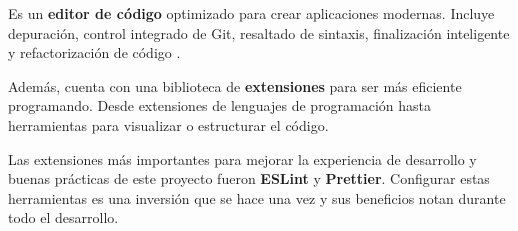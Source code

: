 \documentclass[12pt,twoside,titlepage]{report}
\begin{document}
Es un \textbf{editor de código} optimizado para crear aplicaciones modernas. Incluye depuración, control integrado de Git, resaltado de sintaxis, finalización inteligente y refactorización de código \cite{vscode}.

Además, cuenta con una biblioteca de \textbf{extensiones} para ser más eficiente programando. Desde extensiones de lenguajes de programación hasta herramientas para visualizar o estructurar el código.

Las extensiones más importantes para mejorar la experiencia de desarrollo y buenas prácticas de este proyecto fueron \textbf{ESLint} y \textbf{Prettier}. Configurar estas herramientas es una inversión que se hace una vez y sus beneficios notan durante todo el desarrollo.
\end{document}
